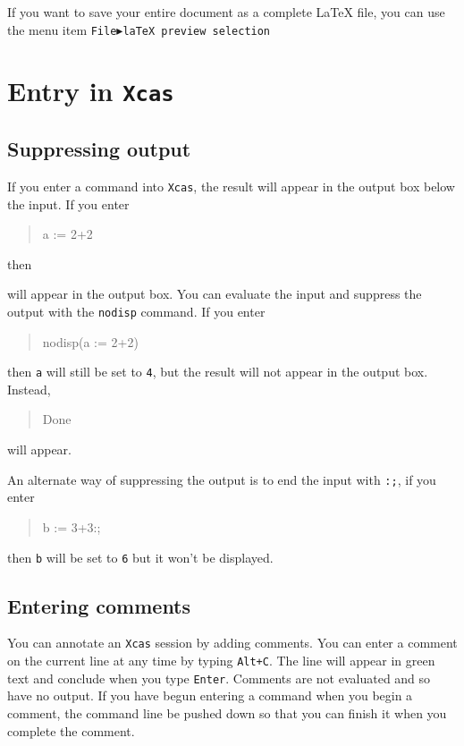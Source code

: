 \documentclass[a4paper,11pt]{book}
\newenvironment{giaccmd}
{\begin{quote}\ttfamily}
{\end{quote}}
\begin{document}
If you want to save your entire document as a complete \LaTeX{} file,
you can use the menu item \texttt{File$\blacktriangleright$laTeX
preview selection}


\chapter{Entry in \texttt{Xcas}}

\section{Suppressing output}

If you enter a command into \texttt{Xcas}, the result will appear in
the output box below the input.  If you enter
\begin{giaccmd}
  a := 2+2
\end{giaccmd}
then 
\begin{giaccmd}
  4
\end{giaccmd}
will appear in the output box.  You can evaluate the input and
suppress the output with the \texttt{nodisp} command.
If you enter 
\begin{giaccmd}
  nodisp(a := 2+2)
\end{giaccmd}
then \texttt{a} will still be set to \texttt{4}, but the result will
not appear in the output box.  Instead, 
\begin{giaccmd}
  Done
\end{giaccmd}
will appear.

An alternate way of suppressing the output is to end the input with
\texttt{:;}\index{:;}, if you enter
\begin{giaccmd}
  b := 3+3:;
\end{giaccmd}
then \texttt{b} will be set to \texttt{6} but it won't be displayed.

\section{Entering comments}

You can annotate an \texttt{Xcas} session by adding comments.
You can enter a comment on the current line at any time by typing
\texttt{Alt+C}.  The line will appear in green text and conclude when
you type \texttt{Enter}.  Comments are not evaluated and so have no
output.  If you have begun entering a command when you begin a
comment, the command line be pushed down so that you can finish it
when you complete the comment.
\end{document}
